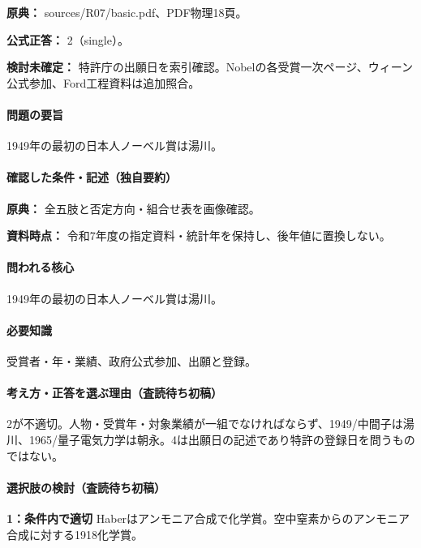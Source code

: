 \noindent\textbf{原典：} sources/R07/basic.pdf、PDF物理18頁。

\textbf{公式正答：} 2（single）。

\par\textbf{検討未確定：} 特許庁の出願日を索引確認。Nobelの各受賞一次ページ、ウィーン公式参加、Ford工程資料は追加照合。

\paragraph{問題の要旨} 1949年の最初の日本人ノーベル賞は湯川。

\paragraph{確認した条件・記述（独自要約）}\mbox{}\par

\noindent\textbf{原典：} 全五肢と否定方向・組合せ表を画像確認。\par

\noindent\textbf{資料時点：} 令和7年度の指定資料・統計年を保持し、後年値に置換しない。\par

\paragraph{問われる核心} 1949年の最初の日本人ノーベル賞は湯川。

\paragraph{必要知識} 受賞者・年・業績、政府公式参加、出願と登録。

\paragraph{考え方・正答を選ぶ理由（査読待ち初稿）} 2が不適切。人物・受賞年・対象業績が一組でなければならず、1949/中間子は湯川、1965/量子電気力学は朝永。4は出願日の記述であり特許の登録日を問うものではない。

\paragraph{選択肢の検討（査読待ち初稿）}\mbox{}\par

\noindent\textbf{1：条件内で適切} Haberはアンモニア合成で化学賞。空中窒素からのアンモニア合成に対する1918化学賞。\par

